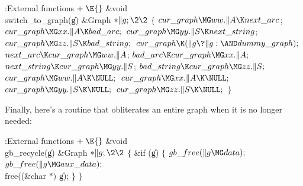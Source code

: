 \Y\B\4:External functions\X${}\mathrel+\E{}$\6
\1\1\&{void} \\{switch\_to\_graph}(\|g)\6
\&{Graph} ${}{*}\|g;\2\2{}$\6
${}\{{}$\1\6
${}\\{cur\_graph}\MG\\{ww}.\|A\K\\{next\_arc}{}$;\5
${}\\{cur\_graph}\MG\\{xx}.\|A\K\\{bad\_arc};{}$\6
${}\\{cur\_graph}\MG\\{yy}.\|S\K\\{next\_string}{}$;\5
${}\\{cur\_graph}\MG\\{zz}.\|S\K\\{bad\_string};{}$\6
${}\\{cur\_graph}\K(\|g\?\|g:{\AND}\\{dummy\_graph});{}$\6
${}\\{next\_arc}\K\\{cur\_graph}\MG\\{ww}.\|A{}$;\5
${}\\{bad\_arc}\K\\{cur\_graph}\MG\\{xx}.\|A;{}$\6
${}\\{next\_string}\K\\{cur\_graph}\MG\\{yy}.\|S{}$;\5
${}\\{bad\_string}\K\\{cur\_graph}\MG\\{zz}.\|S;{}$\6
${}\\{cur\_graph}\MG\\{ww}.\|A\K\NULL;{}$\6
${}\\{cur\_graph}\MG\\{xx}.\|A\K\NULL;{}$\6
${}\\{cur\_graph}\MG\\{yy}.\|S\K\NULL;{}$\6
${}\\{cur\_graph}\MG\\{zz}.\|S\K\NULL;{}$\6
\4${}\}{}$\2\par
\fi

Finally,
here's a routine that obliterates an entire graph when it is no longer needed:

\Y\B\4:External functions\X${}\mathrel+\E{}$\6
\1\1\&{void} \\{gb\_recycle}(\|g)\6
\&{Graph} ${}{*}\|g;\2\2{}$\6
${}\{{}$\1\6
\&{if} (\|g)\5
${}\{{}$\1\6
${}\\{gb\_free}(\|g\MG\\{data});{}$\6
${}\\{gb\_free}(\|g\MG\\{aux\_data});{}$\6
\\{free}((\&{char} ${}{*}){}$ \|g);\6
\4${}\}{}$\2\6
\4${}\}{}$\2\par
\fi

